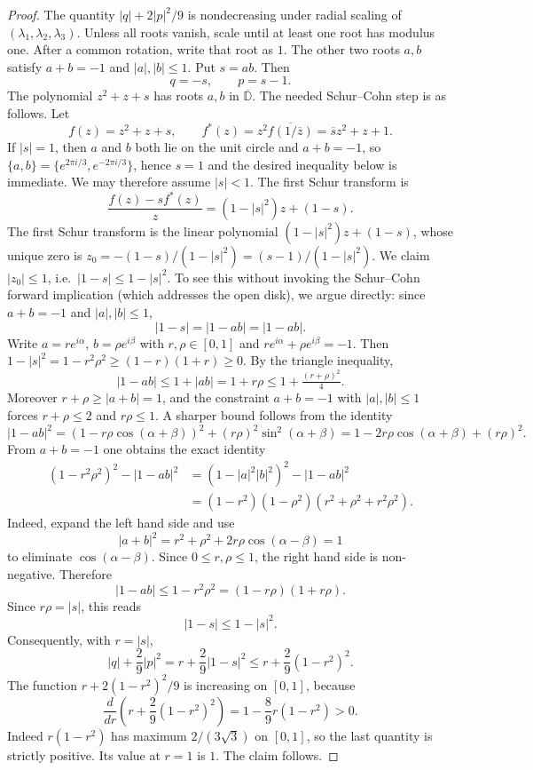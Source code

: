 \documentclass[11pt]{article}
\numberwithin{equation}{section}
\newcommand{\bbD}{\mathbb D}
\begin{document}
\begin{proof}
The quantity \(|q|+2|p|^2/9\) is nondecreasing under radial scaling of
\((\lambda_1,\lambda_2,\lambda_3)\).  Unless all roots vanish, scale until
at least one root has modulus one.  After a common rotation, write that root
as \(1\).  The other two roots \(a,b\) satisfy \(a+b=-1\) and
\(|a|,|b|\le1\).  Put \(s=ab\).  Then
\[
  q=-s,
  \qquad
  p=s-1.
\]
The polynomial \(z^2+z+s\) has roots \(a,b\) in \(\overline{\bbD}\).  The
needed Schur--Cohn step is as follows.  Let
\[
  f(z)=z^2+z+s,
  \qquad
  f^*(z)=z^2\overline{f(1/\overline z)}=\overline{s}z^2+z+1.
\]
If \(|s|=1\), then \(a\) and \(b\) both lie on the unit circle and
\(a+b=-1\), so \(\{a,b\}=\{e^{2\pi i/3},e^{-2\pi i/3}\}\), hence
\(s=1\) and the desired inequality below is immediate.  We may therefore
assume \(|s|<1\).  The first Schur transform is
\[
  \frac{f(z)-s f^*(z)}{z}
  =(1-|s|^2)z+(1-s).
\]
The first Schur transform is the linear polynomial $(1-|s|^2)z+(1-s)$, whose
unique zero is $z_0=-(1-s)/(1-|s|^2)=(s-1)/(1-|s|^2)$.  We claim
$|z_0|\le 1$, i.e.\ $|1-s|\le 1-|s|^2$.  To see this without invoking the
Schur--Cohn forward implication (which addresses the open disk), we argue
directly: since $a+b=-1$ and $|a|,|b|\le 1$,
\[
  |1-s|=|1-ab|=|1-ab|.
\]
Write $a=re^{i\alpha}$, $b=\rho e^{i\beta}$ with $r,\rho\in[0,1]$ and
$re^{i\alpha}+\rho e^{i\beta}=-1$.  Then $1-|s|^2=1-r^2\rho^2\ge(1-r)(1+r)\ge 0$.
By the triangle inequality,
\[
  |1-ab|\le 1+|ab|=1+r\rho\le 1+\tfrac{(r+\rho)^2}{4}.
\]
Moreover $r+\rho\ge|a+b|=1$, and the constraint $a+b=-1$ with $|a|,|b|\le 1$
forces $r+\rho\le 2$ and $r\rho\le 1$.  A sharper bound follows from the
identity
\[
  |1-ab|^2=(1-r\rho\cos(\alpha+\beta))^2+(r\rho)^2\sin^2(\alpha+\beta)
           =1-2r\rho\cos(\alpha+\beta)+(r\rho)^2.
\]
From \(a+b=-1\) one obtains the exact identity
\[
\begin{aligned}
  (1-r^2\rho^2)^2-|1-ab|^2
  &=(1-|a|^2|b|^2)^2-|1-ab|^2  \\
  &=(1-r^2)(1-\rho^2)(r^2+\rho^2+r^2\rho^2).
\end{aligned}
\]
Indeed, expand the left hand side and use
\[
  |a+b|^2=r^2+\rho^2+2r\rho\cos(\alpha-\beta)=1
\]
to eliminate \(\cos(\alpha-\beta)\).  Since \(0\le r,\rho\le1\), the right
hand side is non-negative.  Therefore
\[
  |1-ab|\le 1-r^2\rho^2=(1-r\rho)(1+r\rho).
\]
Since $r\rho=|s|$, this reads
\[
  |1-s|\le1-|s|^2.
\]
Consequently, with \(r=|s|\),
\[
  |q|+\frac{2}{9}|p|^2
  = r+\frac{2}{9}|1-s|^2
  \le r+\frac{2}{9}(1-r^2)^2.
\]
The function \(r+2(1-r^2)^2/9\) is increasing on \([0,1]\), because
\[
  \frac{d}{dr}\left(r+\frac{2}{9}(1-r^2)^2\right)
  =1-\frac{8}{9}r(1-r^2)>0.
\]
Indeed \(r(1-r^2)\) has maximum \(2/(3\sqrt3)\) on \([0,1]\), so the last
quantity is strictly positive.  Its value at \(r=1\) is \(1\).  The claim
follows.
\end{proof}
\end{document}
